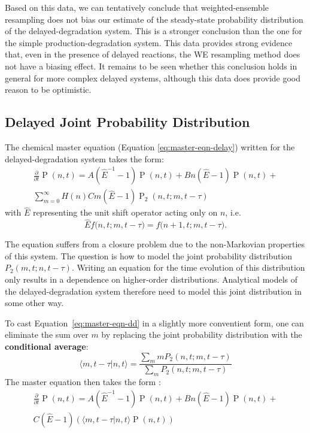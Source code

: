 \documentclass[english,letterpaper,12pt]{report}
\newcommand{\defkeywd}[1]{\textbf{#1}}
\DeclareMathOperator{\Prob}{P}
\begin{document}
\begin{doublespacing}
Based on this data, we can tentatively conclude that weighted-ensemble resampling does not bias our estimate of the steady-state probability distribution of the delayed-degradation system. This is a stronger conclusion than the one for the simple production-degradation system. This data provides strong evidence that, even in the presence of delayed reactions, the WE resampling method does not have a biasing effect. It remains to be seen whether this conclusion holds in general for more complex delayed systems, although this data does provide good reason to be optimistic.


\subsection{Delayed Joint Probability Distribution} %
\label{sub:delayed-joint-dist}
The chemical master equation (Equation \eqref{eq:master-eqn-delay}) written for the delayed-degradation system takes the form:
\begin{multline}
    \frac{\partial}{\partial t} \Prob(n, t) = A(\hat{E}^{-1} - 1) \Prob(n, t) + B n(\hat{E} - 1) \Prob(n, t) + \\
    \sum_{m=0}^{\infty} H(n) C m (\hat{E} - 1) \Prob_2(n, t; m, t - \tau)
    \label{eq:master-eqn-dd}
\end{multline}
with $\hat{E}$ representing the unit shift operator acting only on $n$, i.e.
\[
    \hat{E}{f(n,t;} {m,t-\tau)} = {f(n+1,t;} {m,t-\tau)}.
\]

The equation suffers from a closure problem due to the non-Markovian properties of this system. The question is how to model the joint probability distribution $P_2(m,t; n, t - \tau)$. Writing an equation for the time evolution of this distribution only results in a dependence on higher-order distributions. Analytical models of the delayed-degradation system therefore need to model this joint distribution in some other way.

To cast Equation~\eqref{eq:master-eqn-dd} in a slightly more conventient form, one can eliminate the sum over $m$ by replacing the joint probability distribution with the \defkeywd{conditional average}:
\begin{equation}
    \langle m, t - \tau | n, t \rangle = \frac{\sum_m m P_2(n, t; m, t - \tau)}{\sum_m P_2(n, t; m, t - \tau) }
    \label{eq:cond-avg-def}
\end{equation}
The master equation then takes the form \cite{delayed-deg-notes}:
\begin{multline}
    \frac{\partial}{\partial t} \Prob(n, t) = A(\hat{E}^{-1} - 1) \Prob(n, t) + B n(\hat{E} - 1) \Prob(n, t) + \\
    C (\hat{E} - 1) (\langle m, t - \tau | n, t \rangle \Prob(n, t))
    \label{eq:master-eqn-dd-ca}
\end{multline}


\end{doublespacing}
\end{document}
